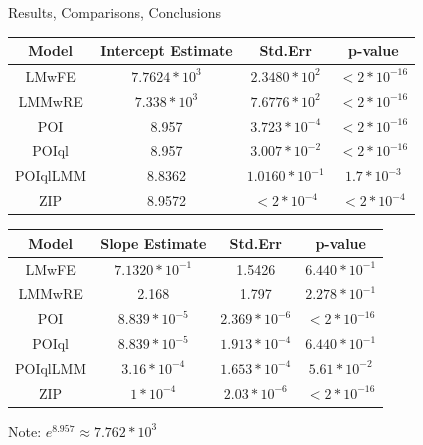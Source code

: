 \documentclass[11pt]{beamer}
\begin{document}
\begin{frame}{Results, Comparisons, Conclusions}

\begin{center}
\begin{tabular}{|c||c|c|c|}
\hline
Model	 &	 Intercept Estimate	&	Std.Err	&	p-value \\
\hline
\hline
LMwFE &  $7.7624 * 10^{3}$ &  $2.3480 * 10^{2}$ & $< 2 * 10^{-16}$  \\
\hline
LMMwRE & $7.338 * 10^{3}$& $7.6776* 10^{2}$ & $< 2 * 10^{-16}$ \\
\hline
POI & 8.957 & $ 3.723 * 10^{-4}$ & $< 2 * 10^{-16}$  \\
\hline
POIql & 8.957 & $3.007 * 10^{-2}$ & $< 2 * 10^{-16}$  \\
\hline
POIqlLMM & 8.8362 & $1.0160* 10^{-1}$ &  $1.7* 10^{-3}$ \\
\hline
ZIP & 8.9572 & $< 2 * 10^{-4}$ & $< 2 * 10^{-4}$ \\
\hline
\end{tabular}
\end{center}


\begin{center}
\begin{tabular}{|c||c|c|c|}
\hline
Model	 &	 Slope Estimate	&	Std.Err	&	p-value \\
\hline
\hline
LMwFE & $7.1320* 10^{-1}$ & 1.5426 &  $6.440* 10^{-1}$  \\
\hline
LMMwRE  & 2.168 & 1.797 & $2.278* 10^{-1}$ \\
\hline
POI & $8.839 * 10^{-5}$ & $2.369 * 10^{-6}$ & $< 2 * 10^{-16}$ \\
\hline
POIql  & $8.839 * 10^{-5}$ & $1.913 * 10^{-4}$ & $6.440* 10^{-1}$ \\
\hline
POIqlLMM  & $3.16* 10^{-4}$ &  $1.653* 10^{-4}$ &  $5.61* 10^{-2}$\\
\hline
ZIP & $1* 10^{-4}$& $2.03 * 10^{-6}$ & $< 2 * 10^{-16}$ \\
\hline
\end{tabular}
\end{center}
Note: $e^{8.957} \approx 7.762 * 10^{3}$
\end{frame}
\end{document}
